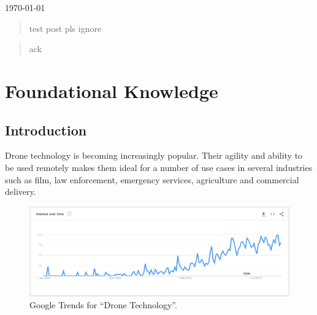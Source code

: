 \documentclass[a4paper,11pt,titlepage]{report}
\begin{document}
\begin{titlepage}

{\large \today}\\[0.5cm] %


\vfill %

\end{titlepage}

\renewcommand{\abstractname}{\large Abstract}
\begin{abstract}
test post pls ignore
\end{abstract}

\renewcommand{\abstractname}{\large Acknowledgements}
\begin{abstract}
ack
\end{abstract}

\newpage

\tableofcontents

\newpage
\listoffigures

\newpage
\listoftables

\newpage
\part{Foundational Knowledge}
\chapter{Introduction}
Drone technology is becoming increasingly popular. Their agility and ability to be used remotely makes them ideal for a number of use cases in several industries such as film, law enforcement, emergency services, agriculture and commercial delivery\cite{Koontz}.

\begin{figure}[!hbpt]
  \center
  \includegraphics[width=\linewidth]{img/drone_interest_over_time_google.png}
  \caption{Google Trends for ``Drone Technology''. \cite{Google2018}}
  \label{fig:starship_citizen}
\end{figure}
\end{document}
